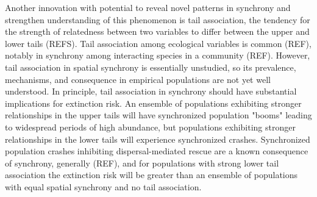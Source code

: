 \documentclass[12pt, oneside]{article}
\begin{document}
Another innovation with potential to reveal novel patterns in synchrony and strengthen understanding of this phenomenon is tail association, the tendency for the strength of relatedness between two variables to differ between the upper and lower tails (REFS).
Tail association among ecological variables is common (REF), notably in synchrony among interacting species in a community (REF). 
However, tail association in spatial synchrony is essentially unstudied, so its prevalence, mechanisms, and consequence in empirical populations are not yet well understood.
In principle, tail association in synchrony should have substantial implications for extinction risk.
An ensemble of populations exhibiting stronger relationships in the upper tails will have synchronized population "booms" leading to widespread periods of high abundance, but populations exhibiting stronger relationships in the lower tails will experience synchronized crashes.
Synchronized population crashes inhibiting dispersal-mediated rescue are a known consequence of synchrony, generally (REF), and for populations with strong lower tail association the extinction risk will be greater than an ensemble of populations with equal spatial synchrony and no tail association. 

\end{document}
